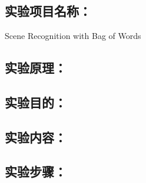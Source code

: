 \documentclass[a4paper,11pt,UTF8,AutoFakeBold]{ctexart}
\begin{document}
\xiaosihao {}  

\author{谢卿云}


\chapter{}{}{}           %

\section{实验项目名称：}
Scene Recognition with Bag of Words

\section{实验原理：}




% 

\section{实验目的：}


\section{实验内容：}


% 

\section{实验步骤：}

\end{document}
